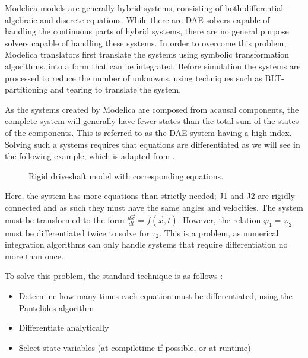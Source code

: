 \documentclass[\rootfolder/main.tex]{subfiles}
\begin{document}
Modelica models are generally hybrid systems, consisting of both differential-algebraic and discrete equations.
While there are DAE solvers capable of handling the continuous parts of hybrid systems, there are no general purpose solvers capable of handling these systems.
In order to overcome this problem, Modelica translators first translate the systems using symbolic transformation algorithms, into a form that can be integrated.
Before simulation the systems are processed to reduce the number of unknowns, using techniques such as BLT-partitioning and tearing \cite{clauss2002} to translate the system.

As the systems created by Modelica are composed from acausal components, the complete system will generally have fewer states than the total sum of the states of the components.
This is referred to as the DAE system having a high index.
Solving such a systems requires that equations are differentiated as we will see in the following example, which is adapted from \cite{clauss2002}.

\begin{figure}[ht]
	\begin{minipage}[c]{.75\columnwidth}
	\end{minipage}%
	\begin{minipage}[c]{.25\columnwidth}
	\end{minipage}
    \caption{Rigid driveshaft model with corresponding equations.}
\end{figure}

Here, the system has more equations than strictly needed;
J1 and J2 are rigidly connected and as such they must have the same angles and velocities.
The system must be transformed to the form $\frac{d\vec{x}}{dt} = f\left(\vec{x}, t\right)$.
However, the relation $\varphi_{1} = \varphi_{2}$ must be differentiated twice to solve for $\tau_{2}$.
This is a problem, as numerical integration algorithms can only handle systems that require differentiation no more than once.

To solve this problem, the standard technique is as follows \cite{clauss2002}:
\begin{itemize}
    \item Determine how many times each equation must be differentiated, using the Pantelides algorithm
    \item Differentiate analytically
    \item Select state variables (at compiletime if possible, or at runtime)
\end{itemize}
\end{document}
